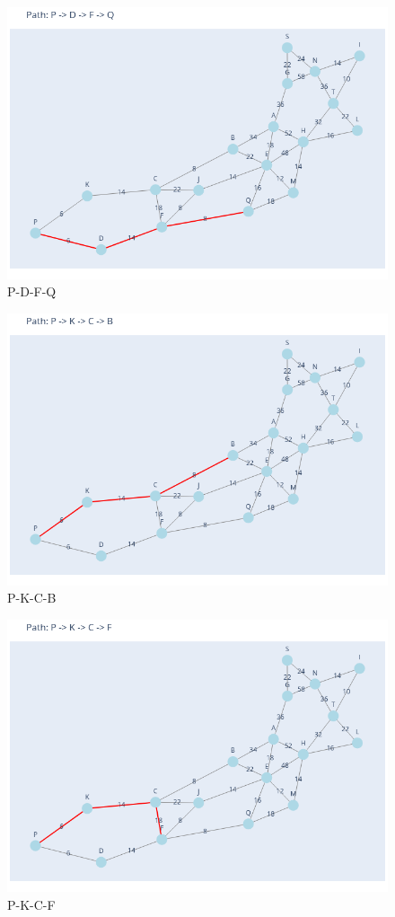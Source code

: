 \documentclass[11pt]{book}
\renewcommand{\=}[1]{\stackrel{#1}{=}} %
\theoremstyle{definition}
\theoremstyle{remark}
\begin{document}
\begin{figure}
    \centering
    \includegraphics[width=0.7\linewidth]{Plots/P_D_F_Q.png}
    \caption{P-D-F-Q}
    \label{fig:enter-label}
\end{figure}
\begin{figure}
    \centering
    \includegraphics[width=0.7\linewidth]{Plots/P_K_C_B.png}
    \caption{P-K-C-B}
    \label{fig:enter-label}
\end{figure}
\begin{figure}
    \centering
    \includegraphics[width=0.7\linewidth]{Plots/P_K_C_F.png}
    \caption{P-K-C-F}
    \label{fig:enter-label}
\end{figure}
\end{document}
